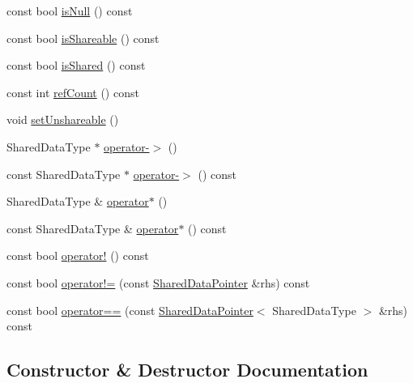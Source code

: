 \begin{DoxyCompactItemize}
\item 
const bool \hyperlink{classprism_1_1_shared_data_pointer_a2791e89091e965f1d06f2986ee05d810}{is\+Null} () const 
\item 
const bool \hyperlink{classprism_1_1_shared_data_pointer_a6b23c069510ae95130c6ecbca454b054}{is\+Shareable} () const 
\item 
const bool \hyperlink{classprism_1_1_shared_data_pointer_ace1d2a6b6563102b321f091729290f33}{is\+Shared} () const 
\item 
const int \hyperlink{classprism_1_1_shared_data_pointer_aec5ca29b4604c039d7fecdead3b03db4}{ref\+Count} () const 
\item 
void \hyperlink{classprism_1_1_shared_data_pointer_af2c4b48383be86e85cb46864ddae768f}{set\+Unshareable} ()
\item 
Shared\+Data\+Type $\ast$ \hyperlink{classprism_1_1_shared_data_pointer_acc512f07fead7332f920071177cad7bb}{operator-\/$>$} ()
\item 
const Shared\+Data\+Type $\ast$ \hyperlink{classprism_1_1_shared_data_pointer_ad107d76166d80cbcd3894533dc7b7be5}{operator-\/$>$} () const 
\item 
Shared\+Data\+Type \& \hyperlink{classprism_1_1_shared_data_pointer_a225343b932084283c498f666a10de3ec}{operator$\ast$} ()
\item 
const Shared\+Data\+Type \& \hyperlink{classprism_1_1_shared_data_pointer_adb8f9ef44184f78552bbfba9e55e7fc5}{operator$\ast$} () const 
\item 
const bool \hyperlink{classprism_1_1_shared_data_pointer_afdfedb3de13176fdc9d7bb8fce20ee9a}{operator!} () const 
\item 
const bool \hyperlink{classprism_1_1_shared_data_pointer_a1a793e8c8410d0a979b0269e071fa82a}{operator!=} (const \hyperlink{classprism_1_1_shared_data_pointer}{Shared\+Data\+Pointer} \&rhs) const 
\item 
const bool \hyperlink{classprism_1_1_shared_data_pointer_ab9603e8d447ca8968d06b29f056110f9}{operator==} (const \hyperlink{classprism_1_1_shared_data_pointer}{Shared\+Data\+Pointer}$<$ Shared\+Data\+Type $>$ \&rhs) const 
\end{DoxyCompactItemize}


\subsection{Constructor \& Destructor Documentation}

